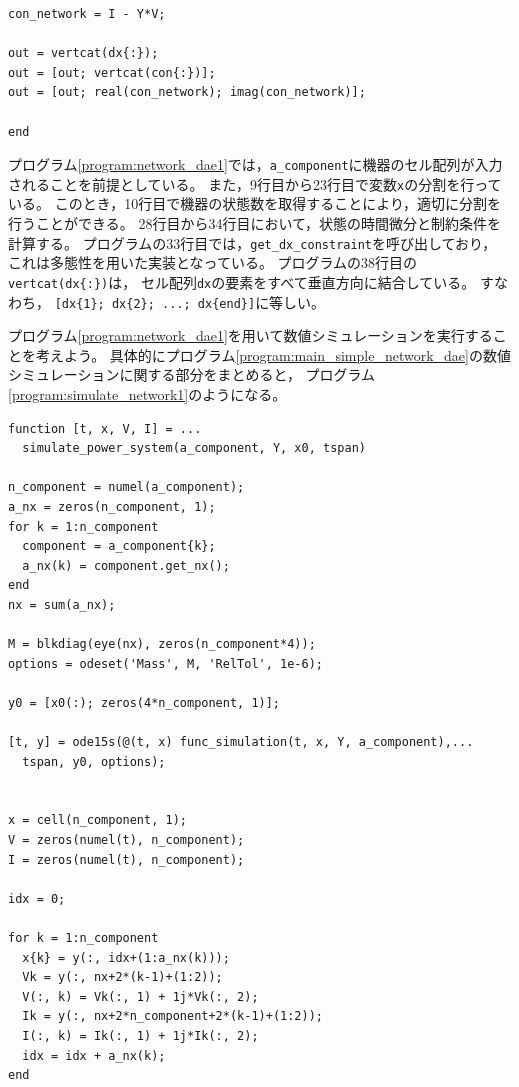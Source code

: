 \documentclass[tombow,dvipdfmx]{corona-a5-1.1}
\begin{document}
\begin{例}[発電機と負荷のモジュール化]
\begin{PROGRAMA}[count,title={func\_simulation.m}]
\begin{verbatim}
con_network = I - Y*V;

out = vertcat(dx{:});
out = [out; vertcat(con{:})];
out = [out; real(con_network); imag(con_network)];

end
\end{verbatim}
\end{PROGRAMA}

プログラム\nobreak\ref{program:network_dae1}では，\verb|a_component|に機器のセル配列が入力されることを前提としている。
また，9行目から23行目で変数\verb|x|の分割を行っている。
このとき，10行目で機器の状態数を取得することにより，適切に分割を行うことができる。
28行目から34行目において，状態の時間微分と制約条件を計算する。
プログラムの33行目では，\verb|get_dx_constraint|を呼び出しており，
これは多態性を用いた実装となっている。
プログラムの38行目の\verb|vertcat(dx{:})|は，
セル配列\verb|dx|の要素をすべて垂直方向に結合している。
すなわち，
\verb|[dx{1}; dx{2}; ...; dx{end}]|に等しい。

プログラム\nobreak\ref{program:network_dae1}を用いて数値シミュレーションを実行することを考えよう。
具体的にプログラム\nobreak\ref{program:main_simple_network_dae}の数値シミュレーションに関する部分をまとめると，
プログラム\nobreak\ref{program:simulate_network1}のようになる。

\smallskip
\begin{PROGRAMA}[count,title={simulate\_power\_system.m}]\label{program:simulate_network1}
\begin{verbatim}
function [t, x, V, I] = ...
  simulate_power_system(a_component, Y, x0, tspan)

n_component = numel(a_component);
a_nx = zeros(n_component, 1);
for k = 1:n_component
  component = a_component{k};
  a_nx(k) = component.get_nx();
end
nx = sum(a_nx);

M = blkdiag(eye(nx), zeros(n_component*4));
options = odeset('Mass', M, 'RelTol', 1e-6);

y0 = [x0(:); zeros(4*n_component, 1)];

[t, y] = ode15s(@(t, x) func_simulation(t, x, Y, a_component),...
  tspan, y0, options);


x = cell(n_component, 1);
V = zeros(numel(t), n_component);
I = zeros(numel(t), n_component);

idx = 0;

for k = 1:n_component
  x{k} = y(:, idx+(1:a_nx(k)));
  Vk = y(:, nx+2*(k-1)+(1:2));
  V(:, k) = Vk(:, 1) + 1j*Vk(:, 2);
  Ik = y(:, nx+2*n_component+2*(k-1)+(1:2));
  I(:, k) = Ik(:, 1) + 1j*Ik(:, 2);
  idx = idx + a_nx(k);
end


\end{verbatim}
\end{PROGRAMA}
\end{例}
\end{document}
